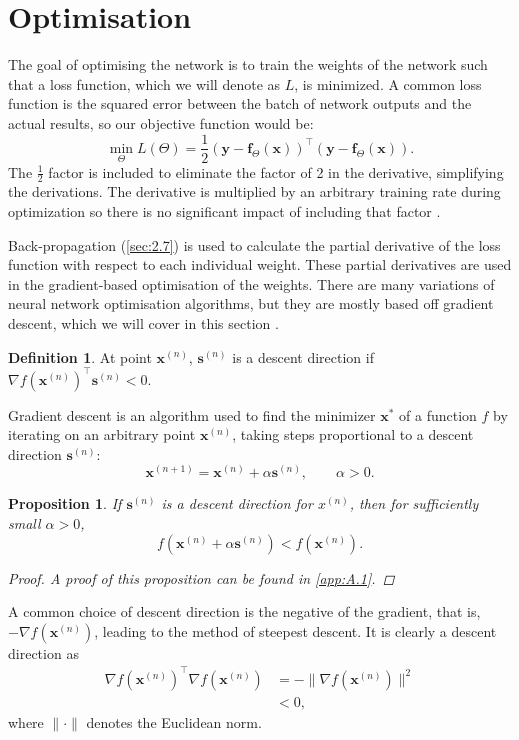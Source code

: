 \documentclass[honours,12pt]{unswthesis}
\newtheorem{proposition}[theorem]{Proposition}
\numberwithin{equation}{section}
\theoremstyle{definition}
\newtheorem{definition}[theorem]{Definition}
\begin{document}
\section{Optimisation}\label{sec:2.6}
The goal of optimising the network is to train the weights of the network such that a loss function, which we will denote as $L$, is minimized. A common loss function is the squared error between the batch of network outputs and the actual results, so our objective function would be:
\[\min_\Theta L(\Theta)=\frac12 (\bm{y}-\bm{f}_\Theta(\bm{x}))^\top(\bm{y}-\bm{f}_\Theta(\bm{x})).\]
The $\frac12$ factor is included to eliminate the factor of 2 in the derivative, simplifying the derivations. The derivative is multiplied by an arbitrary training rate during optimization so there is no significant impact of including that factor \citep{DeepLearning}.

Back-propagation (\autoref{sec:2.7}) is used to calculate the partial derivative of the loss function with respect to each individual weight. These partial derivatives are used in the gradient-based optimisation of the weights. There are many variations of neural network optimisation algorithms, but they are mostly based off gradient descent, which we will cover in this section \citep{optimneural}.
\begin{definition}
At point $\bm{x}^{(n)}$, $\bm{s}^{(n)}$ is a descent direction if $\nabla f\left(\bm{x}^{(n)}\right)^\top \bm{s}^{(n)}<0$.
\end{definition}
Gradient descent \citep{optim} is an algorithm used to find the minimizer $\bm{x}^*$ of a function $f$ by iterating on an arbitrary point $\bm{x}^{(n)}$, taking steps proportional to a descent direction $\bm{s}^{(n)}$:
\[\bm{x}^{(n+1)}=\bm{x}^{(n)}+\alpha \bm{s}^{(n)},\qquad \alpha>0.\]
\begin{proposition} \citep{beck} If $\bm{s}^{(n)}$ is a descent direction for $x^{(n)}$, then for sufficiently small $\alpha>0$,
\[f\left(\bm{x}^{(n)}+\alpha \bm{s}^{(n)}\right)<f\left(\bm{x}^{(n)}\right).\]
\begin{proof}
A proof of this proposition can be found in \autoref{app:A.1}.
\end{proof}
\end{proposition}
A common choice of descent direction is the negative of the gradient, that is, $-\nabla f\left(\bm{x}^{(n)}\right)$, leading to the method of steepest descent. It is clearly a descent direction as 
\begin{align*}
\nabla f(\bm{x}^{(n)})^\top\nabla f\left(\bm{x}^{(n)}\right)&=-\|\nabla f\left(\bm{x}^{(n)}\right)\|^2\\
&<0,
\end{align*} where $\|\cdot\|$ denotes the Euclidean norm.
\end{document}
